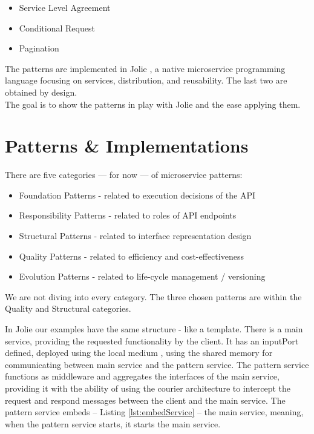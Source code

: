 \documentclass[12pt]{article}
\begin{document}
\begin{itemize}
    \item Service Level Agreement
    \item Conditional Request
    \item Pagination
\end{itemize}

The patterns are implemented in Jolie \cite{JolieAboutPage}, a native microservice programming language focusing on services, distribution, and reusability. The last two are obtained by design. \\
The goal is to show the patterns in play with Jolie and the ease applying them. 

\newpage

\section{Patterns \& Implementations}

There are five categories --- for now --- of microservice patterns: 

\begin{itemize}
    \item Foundation Patterns - related to execution decisions of the API
    \item Responsibility Patterns - related to roles of API endpoints
    \item Structural Patterns - related to interface representation design
    \item Quality Patterns - related to efficiency and cost-effectiveness
    \item Evolution Patterns - related to life-cycle management / versioning
\end{itemize}

We are not diving into every category. The three chosen patterns are within the Quality and Structural categories. 

In Jolie our examples have the same structure - like a template. There is a main service, providing the requested functionality by the client. It has an inputPort defined, deployed using the local medium \cite{LocalLoc}, using the shared memory for communicating between main service and the pattern service. The pattern service functions as middleware and aggregates the interfaces of the main service, providing it with the ability of using the courier \cite{Courier} architecture to intercept the request and respond messages between the client and the main service. The pattern service embeds -- Listing \ref{lst:embedService} -- the main service, meaning, when the pattern service starts, it starts the main service. 
\end{document}
